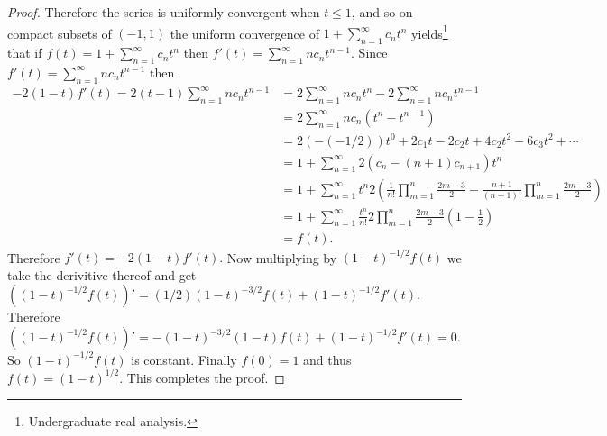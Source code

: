 \documentclass[11pt]{amsart}
\theoremstyle{definition}
\numberwithin{theorem}{section}
\numberwithin{definition}{section}
\numberwithin{equation}{section}
\begin{document}
\begin{proof}
	Therefore the series is uniformly convergent when $t \leq 1$, and so on compact subsets of $(-1,1)$ the uniform convergence of $1 + \sum_{n=1}^\infty c_n t^n$ yields\footnote{Undergraduate real analysis.} that if $f(t) = 1 + \sum_{n=1}^\infty c_n t^n$ then $f'(t) =  \sum_{n=1}^\infty n c_n t^{n-1}.$
	Since $f'(t) =  \sum_{n=1}^\infty n c_n t^{n-1}$ then
	 \begin{equation*}
	 	\begin{aligned}
	 		-2(1-t)f'(t) = 2(t-1)\sum_{n=1}^\infty n c_n t^{n-1} &= 2\sum_{n=1}^\infty n c_n t^{n} - 2\sum_{n=1}^\infty n c_n t^{n-1} \\
	 		&= 2 \sum_{n=1}^\infty n c_n(t^{n} - t^{n-1}) \\
	 		&= 2(-(-1/2))t^0 + 2c_1 t - 2c_2t + 4c_2t^2 - 6c_3t^2 + \cdots \\
	 		&= 1 + \sum_{n=1}^\infty 2(c_n - (n+1)c_{n+1})  t^n  \\
	 		&= 1 + \sum_{n=1}^\infty   t^n  2\left(\frac{1}{n!}\prod_{m=1}^n \frac{2m-3}{2} - \frac{n+1}{(n+1)!}\prod_{m=1}^n \frac{2m-3}{2}\right) \\
	 		&= 1 + \sum_{n=1}^\infty   \frac{t^n}{n!}  2 \prod_{m=1}^n \frac{2m-3}{2} \left(1 - \frac{1}{2}\right) \\
	 		&= f(t).
	 	\end{aligned}
	 \end{equation*}
	 Therefore $f'(t) = -2(1-t)f'(t).$  Now multiplying by $(1-t)^{-1/2} f(t)$ we take the derivitive thereof and get 
	 $((1-t)^{-1/2} f(t))' = (1/2)(1-t)^{-3/2} f(t) + (1-t)^{-1/2} f'(t)$. Therefore 
	 $((1-t)^{-1/2} f(t))' = -(1-t)^{-3/2}(1-t)f(t) + (1-t)^{-1/2} f'(t) = 0.$ So $(1-t)^{-1/2} f(t)$ is constant. Finally
	 $f(0) = 1$ and thus $f(t) = (1-t)^{1/2}.$ This completes the proof.
\end{proof}
\end{document}
